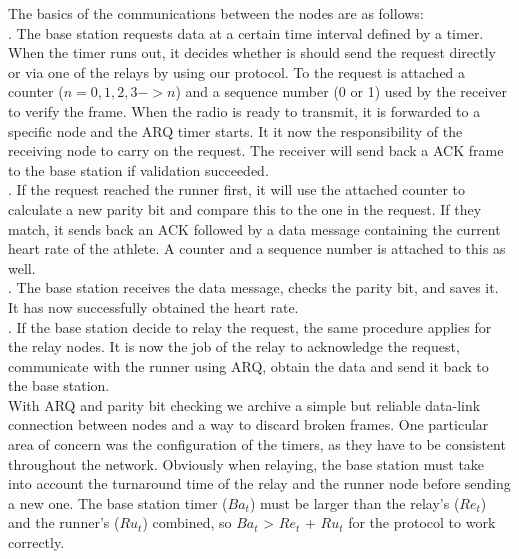 \noindent The basics of the communications between the nodes are as follows: \\ . The base station requests data at a certain time interval defined by a timer. When the timer runs out, it decides whether is should send the request directly or via one of the relays by using our protocol. To the request is attached a counter ($n = 0, 1, 2, 3 -> n$) and a sequence number (0 or 1) used by the receiver to verify the frame. When the radio is ready to transmit, it is forwarded to a specific node and the ARQ timer starts. It it now the responsibility of the receiving node to carry on the request. The receiver will send back a ACK frame to the base station if validation succeeded.\\ . If the request reached the runner first, it will use the attached counter to calculate a new parity bit and compare this to the one in the request. If they match, it sends back an ACK followed by a data message containing the current heart rate of the athlete. A counter and a sequence number is attached to this as well.\\ . The base station receives the data message, checks the parity bit, and saves it. It has now successfully obtained the heart rate.\\ . If the base station decide to relay the request, the same procedure applies for the relay nodes. It is now the job of the relay to acknowledge the request, communicate with the runner using ARQ, obtain the data and send it back to the base station.\\ \newline
\noindent With ARQ and parity bit checking we archive a simple but reliable data-link connection between nodes and a way to discard broken frames. One particular area of concern was the configuration of the timers, as they have to be consistent throughout the network. Obviously when relaying, the base station must take into account the turnaround time of the relay and the runner node before sending a new one. The base station timer ($Ba_t$) must be larger than the relay's ($Re_t$) and the runner's ($Ru_t$) combined, so $Ba_t$ > $Re_t$ + $Ru_t$ for the protocol to work correctly.